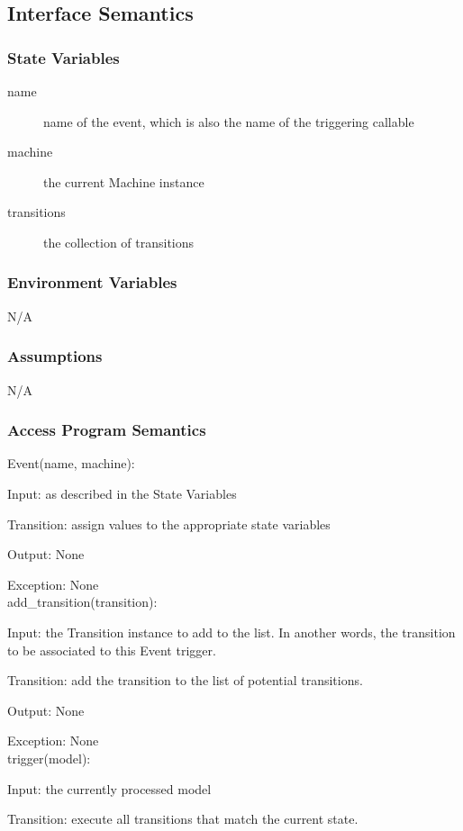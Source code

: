 \documentclass[12pt,titlepage]{article}
\begin{document}
\subsection{Interface Semantics}
\subsubsection{State Variables}
\begin{description}
\item[name] name of the event, which is also the name of the triggering callable
\item[machine] the current Machine instance
\item[transitions] the collection of transitions
\end{description}

\subsubsection{Environment Variables}
N/A

\subsubsection{Assumptions}
N/A

\subsubsection{Access Program Semantics}

Event(name, machine):

Input: as described in the State Variables

Transition: assign values to the appropriate state variables

Output: None

Exception: None\\
add\_transition(transition):

Input: the Transition instance to add to the list. In another words, the
transition to be associated to this Event trigger.

Transition: add the transition to the list of potential transitions.

Output: None

Exception: None\\
trigger(model):

Input: the currently processed model

Transition: execute all transitions that match the current state.
\end{document}
